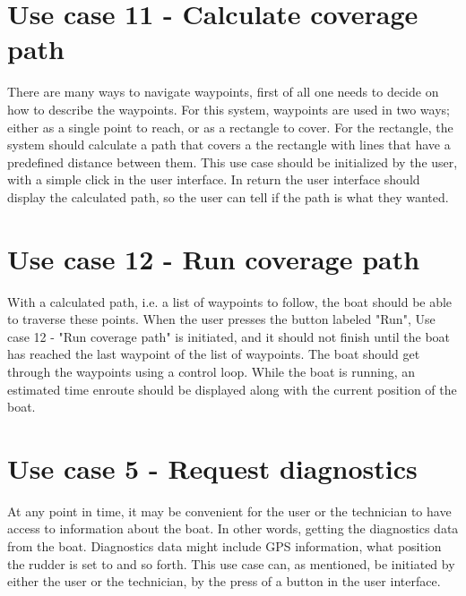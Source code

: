 \section{Use case 11 - Calculate coverage path}
There are many ways to navigate waypoints, first of all one needs to decide on how to describe the waypoints. For this system, waypoints are used in two ways; either as a single point to reach, or as a rectangle to cover. For the rectangle, the system should calculate a path that covers a the rectangle with lines that have a predefined distance between them. This use case should be initialized by the user, with a simple click in the user interface. In return the user interface should display the calculated path, so the user can tell if the path is what they wanted.

\section{Use case 12 - Run coverage path}
With a calculated path, i.e. a list of waypoints to follow, the boat should be able to traverse these points. When the user presses the button labeled "Run", Use case 12 - "Run coverage path" is initiated, and it should not finish until the boat has reached the last waypoint of the list of waypoints. The boat should get through the waypoints using a control loop. While the boat is running, an estimated time enroute should be displayed along with the current position of the boat.

\section{Use case 5 - Request diagnostics}
At any point in time, it may be convenient for the user or the technician to have access to information about the boat. In other words, getting the diagnostics data from the boat. Diagnostics data might include GPS information, what position the rudder is set to and so forth. This use case can, as mentioned, be initiated by either the user or the technician, by the press of a button in the user interface. 



